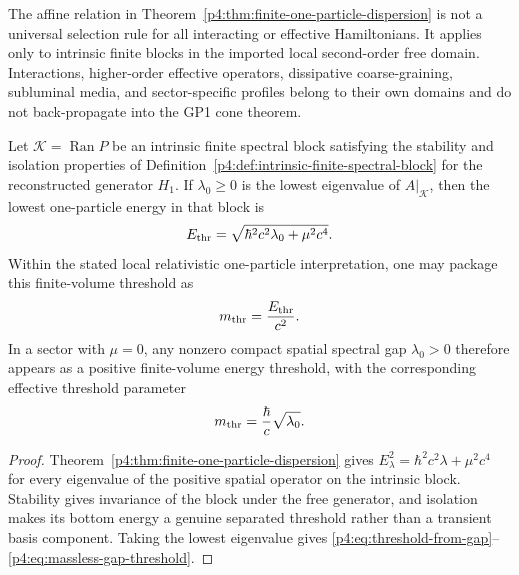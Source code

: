\documentclass[12pt,a4paper]{article}
\begin{document}
\begin{remark}
\label{p4:rem:dispersion-domain}
The affine relation in
Theorem~\ref{p4:thm:finite-one-particle-dispersion} is not a universal
selection rule for all interacting or effective Hamiltonians.  It applies
only to intrinsic finite blocks in the imported local second-order free
domain.  Interactions, higher-order effective operators, dissipative
coarse-graining, subluminal media, and sector-specific profiles belong to
their own domains and do not back-propagate into the GP1 cone theorem.
\end{remark}

\begin{corollary}
\label{p4:cor:spectral-gap-threshold}
Let \(\mathcal K=\operatorname{Ran}P\) be an intrinsic finite spectral block satisfying the stability and isolation properties of Definition~\ref{p4:def:intrinsic-finite-spectral-block} for the reconstructed generator \(H_1\).  If \(\lambda_0\ge0\) is the lowest eigenvalue of \(A|_{\mathcal K}\), then the lowest one-particle energy in that block is
\begin{equation}
\label{p4:eq:threshold-from-gap}
  E_{\rm thr}
  =
  \sqrt{\hbar^2c^2\lambda_0+\mu^2c^4}.
\end{equation}
Within the stated local relativistic one-particle interpretation, one may
package this finite-volume threshold as
\begin{equation}
\label{p4:eq:effective-threshold-mass}
  m_{\rm thr}
  =
  \frac{E_{\rm thr}}{c^2}.
\end{equation}
In a sector with \(\mu=0\), any nonzero compact spatial spectral gap
\(\lambda_0>0\) therefore appears as a positive finite-volume energy
threshold, with the corresponding effective threshold parameter
\begin{equation}
\label{p4:eq:massless-gap-threshold}
  m_{\rm thr}
  =
  \frac{\hbar}{c}\sqrt{\lambda_0}.
\end{equation}
\end{corollary}

\begin{proof}
Theorem~\ref{p4:thm:finite-one-particle-dispersion} gives \(E_\lambda^2=\hbar^2c^2\lambda+\mu^2c^4\) for every eigenvalue of the positive spatial operator on the intrinsic block.  Stability gives invariance of the block under the free generator, and isolation makes its bottom energy a genuine separated threshold rather than a transient basis component.  Taking the lowest eigenvalue gives \eqref{p4:eq:threshold-from-gap}--\eqref{p4:eq:massless-gap-threshold}.
\end{proof}
\end{document}
